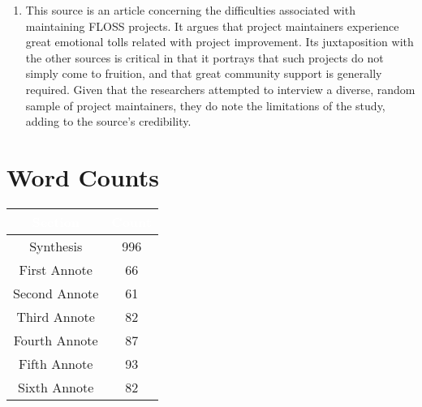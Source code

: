 \documentclass[conference]{IEEEtran}
\begin{document}
\begin{enumerate}
  \item This source is an article concerning the difficulties associated with maintaining FLOSS projects. It argues that project maintainers experience great emotional tolls related with project improvement. Its juxtaposition with the other sources is critical in that it portrays that such projects do not simply come to fruition, and that great community support is generally required. Given that the researchers attempted to interview a diverse, random sample of project maintainers, they do note the limitations of the study, adding to the source's credibility.

\end{enumerate}

\section{Word Counts}

\begin{center}
\begin{tabular}[h]{|c|c|}
  \hline
  \rowcolor{black} \textcolor{white}{Section} & \textcolor{white}{Count}\\
  \hline
  Synthesis & 996\\
  \hline
  \rowcolor{gray!25} First Annote & 66\\
  \hline
  Second Annote & 61\\
  \hline
  \rowcolor{gray!25} Third Annote & 82\\
  \hline
  Fourth Annote & 87\\
  \hline
  \rowcolor{gray!25} Fifth Annote & 93\\
  \hline
  Sixth Annote & 82\\
  \hline
\end{tabular}
\end{center}
\end{document}
